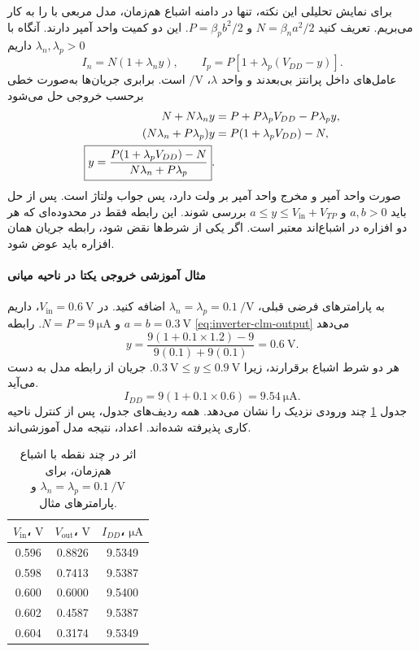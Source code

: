 برای نمایش تحلیلی این نکته، تنها در دامنه اشباع هم‌زمان، مدل
مربعی با  را به کار می‌بریم. تعریف کنید
\(N=\beta_na^2/2\) و \(P=\beta_pb^2/2\). این دو کمیت واحد
آمپر دارند. آنگاه با \(\lambda_n,\lambda_p>0\) داریم
\begin{equation}
 I_n=N(1+\lambda_n y),\qquad
 I_p=P[1+\lambda_p(V_{DD}-y)].
 \label{eq:inverter-clm-currents}
\end{equation}
عامل‌های داخل پرانتز بی‌بعدند و واحد \(\lambda\)،
\(\unit{\per\volt}\) است. برابری جریان‌ها به‌صورت خطی برحسب
خروجی حل می‌شود
\begin{align}
 N+N\lambda_n y&=P+P\lambda_pV_{DD}-P\lambda_p y,\notag\\
 (N\lambda_n+P\lambda_p)y&=P(1+\lambda_pV_{DD})-N,\notag\\
 \boxed{y=\frac{P(1+\lambda_pV_{DD})-N}
                    {N\lambda_n+P\lambda_p}}.
 \label{eq:inverter-clm-output}
\end{align}
صورت واحد آمپر و مخرج واحد آمپر بر ولت دارد، پس جواب ولتاژ است.
پس از حل باید \(a,b>0\) و
\(a\le y\le V_{\mathrm{in}}+V_{TP}\) بررسی شوند. این رابطه
فقط در محدوده‌ای که هر دو افزاره در اشباع‌اند معتبر است.
اگر یکی از شرط‌ها نقض شود، رابطه جریان همان افزاره باید عوض شود.

\paragraph*{مثال آموزشی خروجی یکتا در ناحیه میانی}
به پارامترهای فرضی قبلی،
\(\lambda_n=\lambda_p=\qty{0.1}{\per\volt}\) اضافه کنید.
در \(V_{\mathrm{in}}=\qty{0.6}{\volt}\)، داریم
\(a=b=\qty{0.3}{\volt}\) و \(N=P=\qty{9}{\micro\ampere}\).
رابطه \eqref{eq:inverter-clm-output} می‌دهد
\[
 y=\frac{9(1+0.1\times1.2)-9}{9(0.1)+9(0.1)}
 =\qty{0.6}{\volt}.
\]
هر دو شرط اشباع برقرارند، زیرا
\(\qty{0.3}{\volt}\le y\le\qty{0.9}{\volt}\).
جریان از رابطه مدل به دست می‌آید.
\[
 I_{DD}=9(1+0.1\times0.6)=\qty{9.54}{\micro\ampere}.
\]
جدول \ref{tab:inverter-clm-results} چند ورودی نزدیک را
نشان می‌دهد. همه ردیف‌های جدول، پس از کنترل ناحیه کاری پذیرفته
شده‌اند. اعداد، نتیجه مدل آموزشی‌اند.
\begin{table}[!htbp]
\centering
\caption{اثر  در چند نقطه با اشباع هم‌زمان، برای
\(\lambda_n=\lambda_p=\qty{0.1}{\per\volt}\) و پارامترهای مثال.}
\label{tab:inverter-clm-results}
\begin{tabular}{ccc}
\toprule
\(V_{\mathrm{in}}\)، \(\unit{\volt}\) &
\(V_{\mathrm{out}}\)، \(\unit{\volt}\) &
\(I_{DD}\)، \(\unit{\micro\ampere}\)\\
\midrule
\num{0.596} & \num{0.8826} & \num{9.5349}\\
\num{0.598} & \num{0.7413} & \num{9.5387}\\
\num{0.600} & \num{0.6000} & \num{9.5400}\\
\num{0.602} & \num{0.4587} & \num{9.5387}\\
\num{0.604} & \num{0.3174} & \num{9.5349}\\
\bottomrule
\end{tabular}
\end{table}

